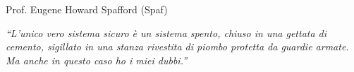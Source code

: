 \documentclass[aspectratio=1610, handout]{beamer}
\begin{document}
\begin{frame}{Prof. Eugene Howard Spafford (Spaf)}
    \begin{minipage}{0.98\linewidth}
        \centering
        \huge
        \textit{``L’unico vero sistema sicuro è un sistema spento, chiuso in una gettata di cemento, 
        sigillato in una stanza rivestita di piombo protetta da guardie armate. 
        Ma anche in questo caso ho i miei dubbi.''}
    \end{minipage}
\end{frame}
\end{document}
